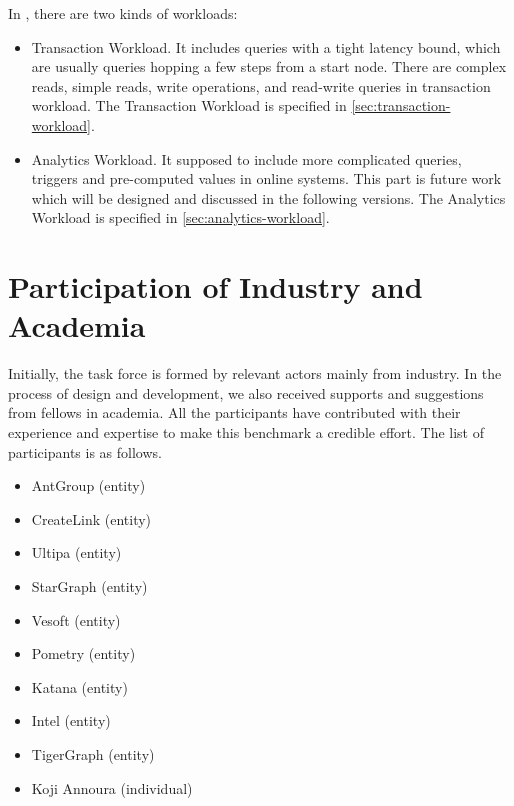 In \ldbcfinbench, there are two kinds of workloads:
\begin{itemize}
      \item Transaction Workload. It includes queries with a tight latency bound, which are usually
            queries hopping a few steps from a start node. There are complex reads, simple reads, write
            operations, and read-write queries in transaction workload. The Transaction Workload is specified
            in \autoref{sec:transaction-workload}.
      \item Analytics Workload. It supposed to include more complicated queries, \eg triggers and pre-computed
            values in online systems. This part is future work which will be designed and discussed in the
            following versions. The Analytics Workload is specified in \autoref{sec:analytics-workload}.
\end{itemize}


\section{Participation of Industry and Academia}

Initially, the \ldbcfinbench task force is formed by relevant actors mainly from
industry. In the process of design and development, we also received supports and
suggestions from fellows in academia. All the participants have contributed with
their experience and expertise to make this benchmark a credible effort. The list
of participants is as follows.

\begin{itemize}
  \item AntGroup (entity)
  \item CreateLink (entity)
  \item Ultipa (entity)
  \item StarGraph (entity)
  \item Vesoft (entity)
  \item Pometry (entity)
  \item Katana (entity)
  \item Intel (entity)
  \item TigerGraph (entity)
  \item Koji Annoura (individual)
\end{itemize}

